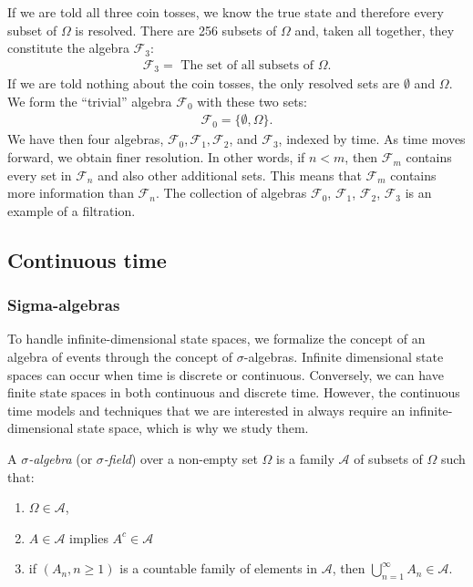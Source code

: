\documentclass[\topdir/lecture\_notes.tex]{subfiles}
\begin{document}
\begin{optional}
\begin{example}
If we are told all three coin tosses, we know the true state and therefore every subset of \(\Omega\) is resolved. There are 256 subsets of \(\Omega\) and, taken all together, they constitute the algebra \(\mathcal{F}_{3}\):
\begin{align*}
\mathcal{F}_{3}=\text{ The set of all subsets of } \Omega.
\end{align*}
If we are told nothing about the coin tosses, the only resolved sets are \(\emptyset\) and \(\Omega\). We form the ``trivial'' algebra \(\mathcal{F}_{0}\) with these two sets:
\begin{align*}
\mathcal{F}_{0}=\{\emptyset, \Omega\}.
\end{align*}
We have then four algebras, \(\mathcal{F}_{0}, \mathcal{F}_{1}, \mathcal{F}_{2}\), and \(\mathcal{F}_{3}\), indexed by time. As time moves forward, we obtain finer resolution. In other words, if \(n<m\), then \(\mathcal{F}_{m}\) contains every set in \(\mathcal{F}_{n}\) and also other additional sets. This means that \(\mathcal{F}_{m}\) contains more information than \(\mathcal{F}_{n}\). The collection of algebras \(\mathcal{F}_{0}\), \(\mathcal{F}_{1}\), \(\mathcal{F}_{2}\), \(\mathcal{F}_{3}\) is an example of a filtration.
\end{example}
\end{optional}

\subsection{Continuous time}
\subsubsection*{Sigma-algebras}
To handle infinite-dimensional state spaces, we formalize the concept of an algebra of events through the concept of \(\sigma\)-algebras. Infinite dimensional state spaces can occur when time is discrete or continuous. Conversely, we can have finite state spaces in both continuous and discrete time. However, the continuous time models and techniques that we are interested in always require an infinite-dimensional state space, which is why we study them.

\begin{defn}\label{defn:sigma_algebra}
A \emph{\(\sigma\)-algebra} (or \emph{\(\sigma\)-field}) over a non-empty set \(\Omega\) is a family \(\mathcal{A}\) of subsets of \(\Omega\) such that:
\begin{enumerate}
    \item \(\Omega \in \mathcal{A}\),
    \item \(A \in \mathcal{A}\) implies \(A^{c} \in \mathcal{A}\) 
    \item if \((A_{n}, n \geq 1)\) is a countable family of elements in \(\mathcal{A}\), then \(\bigcup_{n=1}^{\infty} A_{n} \in \mathcal{A}\).
\end{enumerate}
\end{defn}
\end{document}
